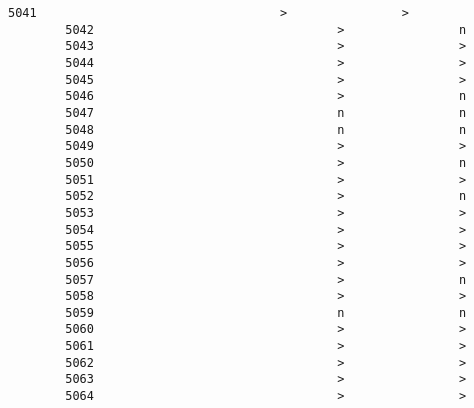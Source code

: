 \documentclass[11pt]{article}
\begin{document}
\begin{Verbatim}[commandchars=\\\{\}]
        5041                                  >                >   
        5042                                  >                n   
        5043                                  >                >   
        5044                                  >                >   
        5045                                  >                >   
        5046                                  >                n   
        5047                                  n                n   
        5048                                  n                n   
        5049                                  >                >   
        5050                                  >                n   
        5051                                  >                >   
        5052                                  >                n   
        5053                                  >                >   
        5054                                  >                >   
        5055                                  >                >   
        5056                                  >                >   
        5057                                  >                n   
        5058                                  >                >   
        5059                                  n                n   
        5060                                  >                >   
        5061                                  >                >   
        5062                                  >                >   
        5063                                  >                >   
        5064                                  >                >   
        

\end{Verbatim}
\end{document}
